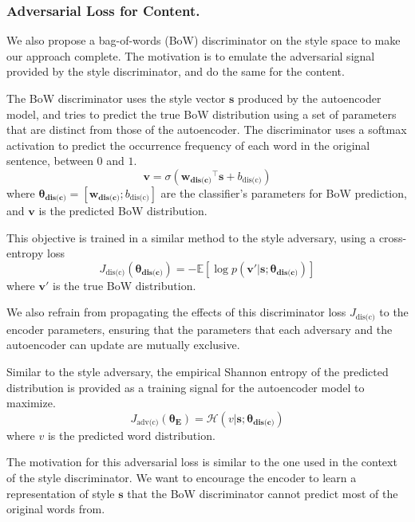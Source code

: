 \documentclass[letterpaper]{article} %
\newcommand{\loss}[1]{J_{\text{#1}}}
\newcommand{\nnweight}[1]{\bm{\theta_{\text{#1}}}}
\newcommand{\weight}[1]{\bm{w_{\text{#1}}}}
\newcommand{\bias}[1]{b_{\text{#1}}}
\begin{document}
\subsubsection{Adversarial Loss for Content.} \label{ssec:adversarial-content-objective}

We also propose a bag-of-words (BoW) discriminator on the style space to make our approach complete.
The motivation is to emulate the adversarial signal provided by the style discriminator, and do the same for the content.

The BoW discriminator uses the style vector $\bm s$ produced by the autoencoder model, and tries to predict the true BoW distribution using a set of parameters that are distinct from those of the autoencoder.
The discriminator uses a softmax activation to predict the occurrence frequency of each word in the original sentence, between $0$ and $1$.
\begin{equation}
	\bm v = \sigma({\weight{dis(c)}}^\top \bm s + \bias{dis(c)})
\end{equation}
where $\nnweight{dis(c)}=[\weight{dis(c)}; \bias{dis(c)}]$ are the classifier's parameters for BoW prediction, and $\bm v$ is the predicted BoW distribution.

This objective is trained in a similar method to the style adversary, using a cross-entropy loss
\begin{equation} \label{eqn:adv-bow-disc-loss}
	\loss{dis(c)}(\nnweight{dis(c)}) =
	- \mathbb{E} [\log p(\bm v' | \bm s; \nnweight{dis(c)})]
\end{equation}
where $\bm v'$ is the true BoW distribution.

We also refrain from propagating the effects of this discriminator loss $\loss{dis(c)}$ to the encoder parameters, ensuring that the parameters that each adversary and the autoencoder can update are mutually exclusive.

Similar to the style adversary, the empirical Shannon entropy of the predicted distribution is provided as a training signal for the autoencoder model to maximize.
\begin{equation}
	\loss{adv(c)}(\nnweight{E}) = \mathcal{H}(v | \bm s; \nnweight{dis(c)})
\end{equation}
where $v$ is the predicted word distribution.

The motivation for this adversarial loss is similar to the one used in the context of the style discriminator.
We want to encourage the encoder to learn a representation of style $\bm s$ that the BoW discriminator cannot predict most of the original words from.
\end{document}
